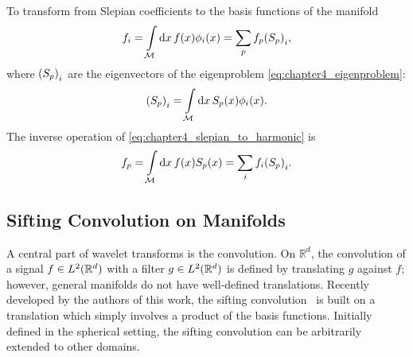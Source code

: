 To transform from Slepian coefficients to the basis functions of the manifold
%
\begin{equation}\label{eq:chapter4_slepian_to_harmonic}
	f_{i}
	= \int\limits_{\mathcal{M}} \dd{x} f(x) \phi_{i}(x)
	= \sum\limits_{p} {f}_{p} {({S}_{p})}_{i},
\end{equation}
%
where \({({S}_{p})}_{i}\) are the eigenvectors of the eigenproblem \cref{eq:chapter4_eigenproblem}:
%
\begin{equation}
	{({S}_{p})}_{i}
	= \int\limits_{\mathcal{M}} \dd{x} {S}_{p}(x) \phi_{i}(x).
\end{equation}
%
The inverse operation of \cref{eq:chapter4_slepian_to_harmonic} is
%
\begin{equation}\label{eq:chapter4_harmonic_to_slepian}
	{f}_{p}
	= \int\limits_{\mathcal{M}} \dd{x} f(x) {S}_{p}(x)
	= \sum\limits_{i} f_{i} {({S}_{p})}_{i}.
\end{equation}

\subsection{Sifting Convolution on Manifolds}\label{sec:chapter4_sifting_convolution_manifolds}

A central part of wavelet transforms is the convolution.
On \(\mathbb{R}^{d}\), the convolution of a signal \(f \in L^{2}(\mathbb{R}^{d})\) with a filter \(g \in L^{2}(\mathbb{R}^{d})\) is defined by translating \(g\) against \(f\); however, general manifolds do not have well-defined translations.
Recently developed by the authors of this work, the sifting convolution~\cite{Roddy2021} is built on a translation which simply involves a product of the basis functions.
Initially defined in the spherical setting, the sifting convolution can be arbitrarily extended to other domains.

